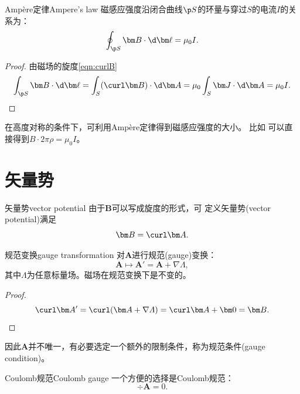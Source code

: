 \begin{theorem}{Ampère定律}{Ampere's law}
    磁感应强度沿闭合曲线$\p S$的环量与穿过$S$的电流$I$的关系为：
    \begin{equation}
        \label{eqn:Ampere}
        \oint_{\p S}\bm B\cdot\d\bm\ell=\mu_0I.
    \end{equation}
\end{theorem}

\begin{proof}
    由磁场的旋度\eqref{eqn:curlB}
    \[
        \int_{\p S}\bm B\cdot\d\bm\ell=\int_S(\curl\bm B)\cdot\d\bm A=\mu_0\int_S\bm J\cdot\d\bm A=\mu_0I.
        \qedhere
    \]
\end{proof}

\begin{remark}
    在高度对称的条件下，可利用Ampère定律得到磁感应强度的大小。
    比如 可以直接得到$B\cdot 2\pi\rho=\mu_0I$。
\end{remark}

\section{矢量势}
\label{sec:vector potential}

\begin{definition}{矢量势}{vector potential}
    由于$\bm B$可以写成旋度的形式，可
    定义矢量势(vector potential)满足
    \begin{equation}
        \label{eqn:B=curlA}
        \bm B=\curl\bm A.
    \end{equation}
\end{definition}

\begin{theorem}
    {规范变换}{gauge transformation}
    对$\bm A$进行规范(gauge)变换：
    \[
        \bm A\mapsto\bm A'=\bm A+\nabla\varLambda,
    \]
    其中$\varLambda$为任意标量场。磁场在规范变换下是不变的。
\end{theorem}

\begin{proof}
    \[
        \curl\bm A'=\curl(\bm A+\nabla\varLambda)=\curl\bm A+\bm 0=\bm B.
        \qedhere    
    \]
\end{proof}

\begin{corollary}
    因此$\bm A$并不唯一，有必要选定一个额外的限制条件，称为规范条件(gauge condition)。
\end{corollary}

\begin{definition}
    {Coulomb规范}{Coulomb gauge}
    一个方便的选择是Coulomb规范：
    \begin{equation}
        \div\bm A=0.
    \end{equation}
\end{definition}

